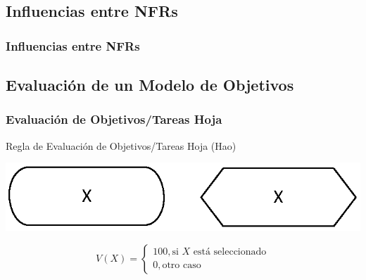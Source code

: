 \documentclass[handout,a4paper,slidestop,xcolor=pst,dvips,blue]{beamer}
\begin{document}
\subsection{Influencias entre NFRs}

\begin{frame}[t]
    \frametitle{Influencias entre NFRs}
\end{frame}

\subsection{Evaluación de un Modelo de Objetivos}

\begin{frame}[c]
    \frametitle{Evaluación de Objetivos/Tareas Hoja}
    \begin{block}{Regla de Evaluación de Objetivos/Tareas Hoja (Hao)}
        \begin{center}
    	   \includegraphics[width=0.5\linewidth,keepaspectratio=true]{images/influences/leafGoal.eps}
        \end{center}
        \begin{equation*}
        V(X) =
            \begin{cases}
                100, \text{si\ } X \text{\ está seleccionado} \\
                0, \text{otro caso}
            \end{cases}
        \end{equation*}
        \ \\ \ \\
    \end{block}
\end{frame}
\end{document}
